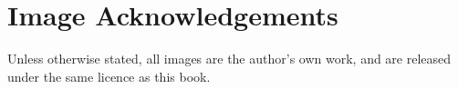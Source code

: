 \chapter{Image Acknowledgements}
Unless otherwise stated, all images are the author's own work, and are released under the same licence as this book.

\printbibliography[heading=bibintoc, title={References and Bibliography}]
\printindex



